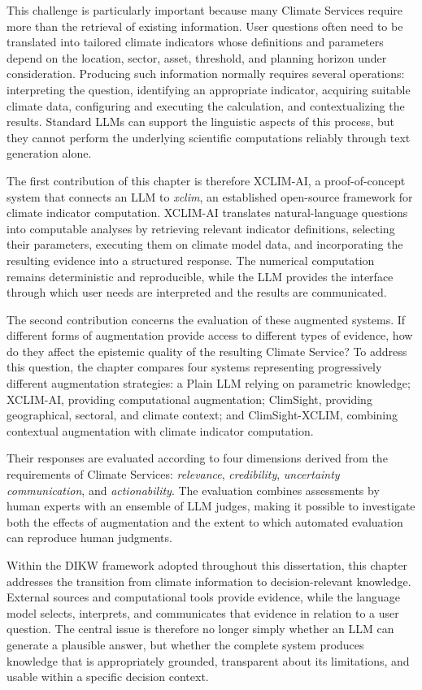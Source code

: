 This challenge is particularly important because many Climate Services require more than the retrieval of existing information. User questions often need to be translated into tailored climate indicators whose definitions and parameters depend on the location, sector, asset, threshold, and planning horizon under consideration. Producing such information normally requires several operations: interpreting the question, identifying an appropriate indicator, acquiring suitable climate data, configuring and executing the calculation, and contextualizing the results. Standard LLMs can support the linguistic aspects of this process, but they cannot perform the underlying scientific computations reliably through text generation alone.

The first contribution of this chapter is therefore XCLIM-AI, a proof-of-concept system that connects an LLM to \emph{xclim}, an established open-source framework for climate indicator computation. XCLIM-AI translates natural-language questions into computable analyses by retrieving relevant indicator definitions, selecting their parameters, executing them on climate model data, and incorporating the resulting evidence into a structured response. The numerical computation remains deterministic and reproducible, while the LLM provides the interface through which user needs are interpreted and the results are communicated.

The second contribution concerns the evaluation of these augmented systems. If different forms of augmentation provide access to different types of evidence, how do they affect the epistemic quality of the resulting Climate Service? To address this question, the chapter compares four systems representing progressively different augmentation strategies: a Plain LLM relying on parametric knowledge; XCLIM-AI, providing computational augmentation; ClimSight, providing geographical, sectoral, and climate context; and ClimSight-XCLIM, combining contextual augmentation with climate indicator computation.

Their responses are evaluated according to four dimensions derived from the requirements of Climate Services: \emph{relevance}, \emph{credibility}, \emph{uncertainty communication}, and \emph{actionability}. The evaluation combines assessments by human experts with an ensemble of LLM judges, making it possible to investigate both the effects of augmentation and the extent to which automated evaluation can reproduce human judgments.

Within the DIKW framework adopted throughout this dissertation, this chapter addresses the transition from climate information to decision-relevant knowledge. External sources and computational tools provide evidence, while the language model selects, interprets, and communicates that evidence in relation to a user question. The central issue is therefore no longer simply whether an LLM can generate a plausible answer, but whether the complete system produces knowledge that is appropriately grounded, transparent about its limitations, and usable within a specific decision context.


